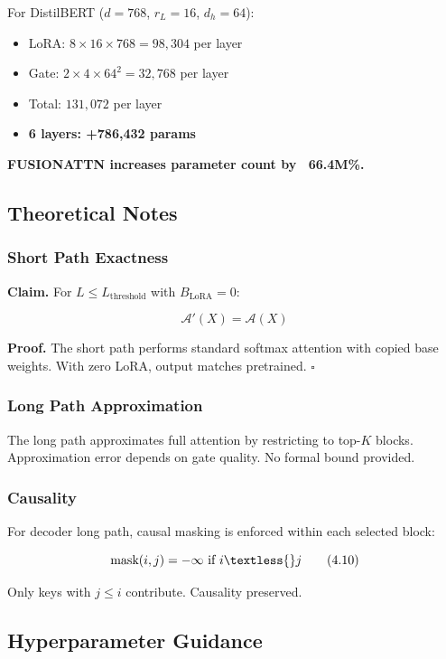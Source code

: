 For DistilBERT ($d=768$, $r_L=16$, $d_h=64$):

\begin{itemize}
\item LoRA: $8 \times 16 \times 768 = 98{,}304$ per layer
\item Gate: $2 \times 4 \times 64^2 = 32{,}768$ per layer
\item Total: $131{,}072$ per layer
\item \textbf{6 layers: +786,432 params}

\end{itemize}
\textbf{FUSIONATTN increases parameter count by ~66.4M\%.}

\subsection{Theoretical Notes}

\subsubsection{Short Path Exactness}

\textbf{Claim.} For $L \leq L_\text{threshold}$ with $B_\text{LoRA} = 0$:

\[
\mathcal{A}'(X) = \mathcal{A}(X)
\tag{4.9}
\]

\textbf{Proof.} The short path performs standard softmax attention with copied 
base weights. With zero LoRA, output matches pretrained. $\square$

\subsubsection{Long Path Approximation}

The long path approximates full attention by restricting to top-$K$ blocks. 
Approximation error depends on gate quality. No formal bound provided.

\subsubsection{Causality}

For decoder long path, causal masking is enforced within each selected block:

\[
\text{mask}(i, j) = -\infty \text{ if } i \textless{} j
\tag{4.10}
\]

Only keys with $j \leq i$ contribute. Causality preserved.

\subsection{Hyperparameter Guidance}

